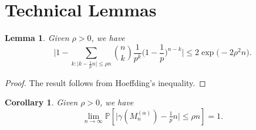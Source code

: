 \documentclass[12pt]{amsart}
\newtheorem{corollary}{Corollary}[theorem]
\newtheorem{lemma}[theorem]{Lemma}
\theoremstyle{definition}
\newcommand{\PPP}{\mathbb{P}}
\newcommand{\Mna}{M_{n}^{(\alpha)}}
\newcommand{\abs}[1]{\vert#1\vert}
\begin{document}
\section{Technical Lemmas}\label{Sec: tech lemma dir}


\begin{lemma}\label{Lem: bound tail}
Given $\rho>0$, we have
\[
\bigg| 1-\sum_{k:\abs{k-\frac{1}{p}n}\leq \rho n}\binom{n}{k} \frac{1}{p^k} \Big(1-\frac{1}{p}\Big)^{n-k} \bigg|
\leq 2\exp\big(-2\rho^2 n\big).
\]
\end{lemma}
\begin{proof}
The result follows from Hoeffding's inequality.
\end{proof}

\begin{corollary}\label{Cor: prob of cond to 1}
Given $\rho>0$, we have
\[
\lim_{n\to\infty} 
\PPP[\abs{\gamma(\Mna)- \tfrac{1}{p} n} \leq \rho n] 
=1.
\]
\end{corollary}
\end{document}
